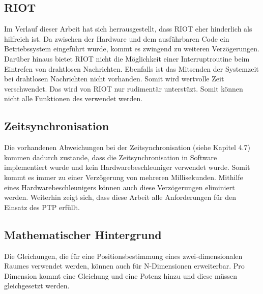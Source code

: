 \subsection{RIOT}
Im Verlauf dieser Arbeit hat sich herrausgestellt, dass RIOT eher hinderlich als hilfreich ist. Da zwischen der Hardware und dem ausführbaren Code ein Betriebssystem eingeführt wurde, kommt es zwingend zu weiteren Verzögerungen. Darüber hinaus bietet RIOT nicht die Möglichkeit einer Interruptroutine beim Eintrefen von drahtlosen Nachrichten. Ebenfalls ist das Mitsenden der Systemzeit bei drahtlosen Nachrichten nicht vorhanden. Somit wird wertvolle Zeit verschwendet. Das \board \platz wird von RIOT nur rudimentär unterstüzt. Somit können nicht alle Funktionen des \board \platz verwendet werden.

\subsection{Zeitsynchronisation}
Die vorhandenen Abweichungen bei der Zeitsynchronisation (siehe Kapitel 4.7) kommen dadurch zustande, dass die Zeitsynchronisation in Software implementiert wurde und kein Hardwarebeschleuniger verwendet wurde. Somit kommt es immer zu einer Verzögerung von mehreren Millisekunden. Mithilfe eines Hardwarebeschleunigers können auch diese Verzögerungen eliminiert werden. Weiterhin zeigt sich, dass diese Arbeit alle Anforderungen für den Einsatz des PTP erfüllt.

\subsection{Mathematischer Hintergrund}
Die Gleichungen, die für eine Positionsbestimmung eines zwei-dimensionalen Raumes verwendet werden, können auch für \si{N}-Dimensionen erweiterbar. Pro Dimension kommt eine Gleichung und eine Potenz hinzu und diese müssen gleichgesetzt werden.

